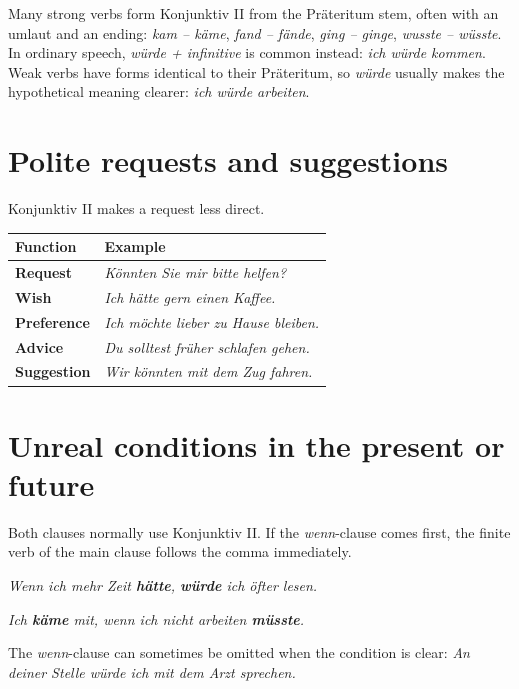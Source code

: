 Many strong verbs form Konjunktiv II from the Präteritum stem, often with an
umlaut and an ending: \textit{kam -- käme}, \textit{fand -- fände},
\textit{ging -- ginge}, \textit{wusste -- wüsste}. In ordinary speech,
\textit{würde + infinitive} is common instead: \textit{ich würde kommen}.
Weak verbs have forms identical to their Präteritum, so \textit{würde} usually
makes the hypothetical meaning clearer: \textit{ich würde arbeiten}.

\section{Polite requests and suggestions}

Konjunktiv II makes a request less direct.

\begin{center}
\small
{}
\begin{tabularx}{\textwidth}{@{}>{\bfseries}l X@{}}
\toprule
Function & Example \\
\midrule
Request & \textit{Könnten Sie mir bitte helfen?} \\
Wish & \textit{Ich hätte gern einen Kaffee.} \\
Preference & \textit{Ich möchte lieber zu Hause bleiben.} \\
Advice & \textit{Du solltest früher schlafen gehen.} \\
Suggestion & \textit{Wir könnten mit dem Zug fahren.} \\
\bottomrule
\end{tabularx}
\end{center}

\section{Unreal conditions in the present or future}

Both clauses normally use Konjunktiv II\@. If the \textit{wenn}-clause comes
first, the finite verb of the main clause follows the comma immediately.

\begin{center}
\textit{Wenn ich mehr Zeit \textbf{hätte}, \textbf{würde} ich öfter lesen.}

\textit{Ich \textbf{käme} mit, wenn ich nicht arbeiten \textbf{müsste}.}
\end{center}

The \textit{wenn}-clause can sometimes be omitted when the condition is clear:
\textit{An deiner Stelle würde ich mit dem Arzt sprechen.}

